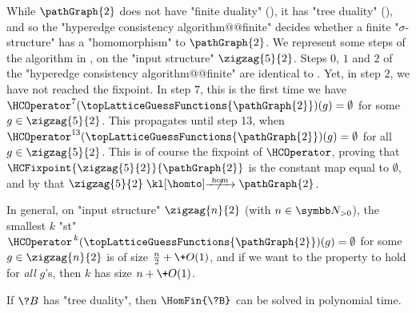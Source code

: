 \begin{example}
	\AP\label{ex:zigzag-HC-P2}
	While $\pathGraph{2}$ does not have "finite duality" (), it has
	"tree duality" (), and so the "hyperedge consistency algorithm@@finite"
	decides whether a finite "$\sigma$-structure" has a "homomorphism" to $\pathGraph{2}$.
	We represent some steps of the algorithm in ,
	on the "input structure" $\zigzag{5}{2}$.
	Steps $0$, $1$ and $2$ of the "hyperedge consistency algorithm@@finite"
	are identical to .
	Yet, in step $2$, we have not reached the fixpoint.
	In step $7$, this is the first time
	we have $\HCOperator^{7}(\topLatticeGuessFunctions{\pathGraph{2}})(g) = \emptyset$ for some
	$g\in \zigzag{5}{2}$. This propagates until step 13, 
	when $\HCOperator^{13}(\topLatticeGuessFunctions{\pathGraph{2}})(g) = \emptyset$
	for all $g\in \zigzag{5}{2}$. This is of course the fixpoint of $\HCOperator$,
	proving that $\HCFixpoint{\zigzag{5}{2}}{\pathGraph{2}}$ is the constant map
	equal to $\emptyset$, and by 
	that $\zigzag{5}{2} \nothomto \pathGraph{2}$.

	In general, on "input structure" $\zigzag{n}{2}$ (with $n\in\Np$),
	the smallest $k$ "st" $\HCOperator^{\,k}(\topLatticeGuessFunctions{\pathGraph{2}})(g) = \emptyset$
	for some $g \in \zigzag{n}{2}$ is of size $\frac{n}{2} + \+O(1)$,
	and if we want to the property to hold for \emph{all} $g$'s,
	then $k$ has size $n + \+O(1)$.
\end{example}

\begin{corollary}
	If $\?B$ has "tree duality", then $\HomFin{\?B}$ can be solved in
	polynomial time.
\end{corollary}



